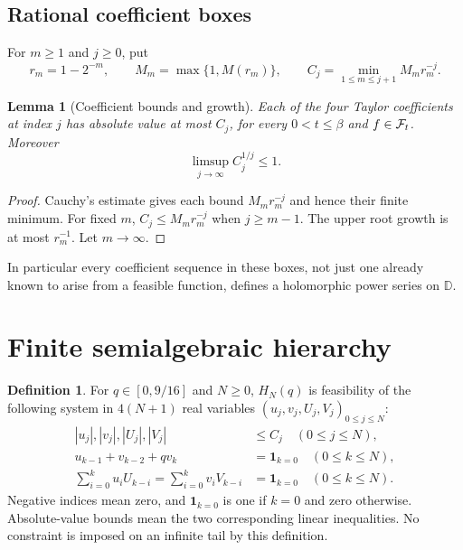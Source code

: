 \documentclass[11pt,a4paper]{article}
\newtheorem{lemma}[theorem]{Lemma}
\theoremstyle{definition}\newtheorem{definition}[theorem]{Definition}
\theoremstyle{remark}\newtheorem{remark}[theorem]{Remark}
\newcommand{\D}{\mathbb D}\newcommand{\R}{\mathbb R}
\newcommand{\idzero}[1]{\mathbf1_{#1=0}}
\begin{document}
\subsection{Rational coefficient boxes}
For $m\geq1$ and $j\geq0$, put
\begin{equation}\label{eq:boxes}
 r_m=1-2^{-m},\qquad M_m=\max\{1,M(r_m)\},\qquad
 C_j=\min_{1\leq m\leq j+1}M_m r_m^{-j}.
\end{equation}
\begin{lemma}[Coefficient bounds and growth]\label{lem:coeff}
Each of the four Taylor coefficients at index $j$ has absolute value
at most $C_j$, for every $0<t\leq\beta$ and $f\in\mathcal F_t$. Moreover
\begin{equation}\label{eq:growth}
 \limsup_{j\to\infty}C_j^{1/j}\leq1.
\end{equation}
\end{lemma}
\begin{proof}
Cauchy's estimate gives each bound $M_m r_m^{-j}$ and hence their finite
minimum. For fixed $m$, $C_j\leq M_mr_m^{-j}$ when $j\geq m-1$.
The upper root growth is at most $r_m^{-1}$. Let $m\to\infty$.
\end{proof}
In particular every coefficient sequence in these boxes, not just one
already known to arise from a feasible function, defines a holomorphic
power series on $\D$.

\section{Finite semialgebraic hierarchy}\label{sec:hierarchy}
\begin{definition}\label{def:hierarchy}
For $q\in[0,9/16]$ and $N\geq0$, $H_N(q)$ is feasibility of the
following system in $4(N+1)$ real variables
$(u_j,v_j,U_j,V_j)_{0\leq j\leq N}$:
\begin{align}
 |u_j|,|v_j|,|U_j|,|V_j|&\leq C_j\quad(0\leq j\leq N),\label{eq:Hbox}\\
 u_{k-1}+v_{k-2}+qv_k&=\idzero{k}\quad(0\leq k\leq N),\label{eq:Hlinear}\\
 \sum_{i=0}^k u_iU_{k-i}=\sum_{i=0}^k v_iV_{k-i}
 &=\idzero{k}\quad(0\leq k\leq N).\label{eq:Hproduct}
\end{align}
Negative indices mean zero, and $\idzero{k}$ is one if $k=0$ and zero
otherwise. Absolute-value bounds mean the two corresponding linear
inequalities. No constraint is imposed on an infinite tail by this definition.
\end{definition}
\end{document}
